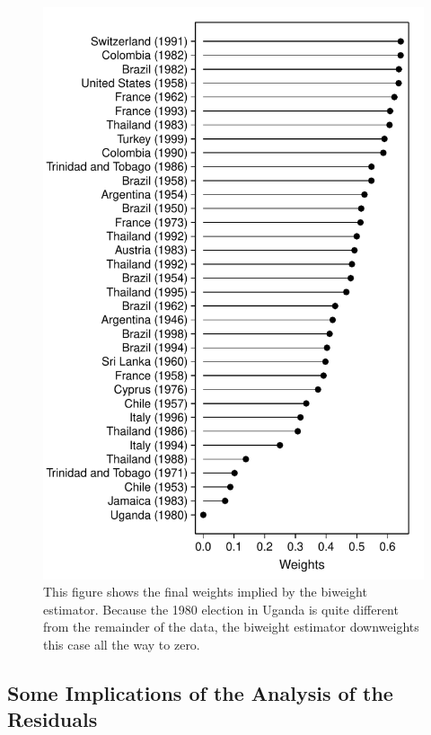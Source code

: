 \documentclass[12pt]{article}
\begin{document}
\begin{figure}[h!]
\begin{center}
\includegraphics[scale = 0.8]{figs/cg-weights.pdf}
\caption{This figure shows the final weights implied by the biweight estimator. Because the 1980 election in Uganda is quite different from the remainder of the data, the biweight estimator downweights this case all the way to zero.}\label{fig:cg-weights}
\end{center}
\end{figure}

\subsection*{Some Implications of the Analysis of the Residuals}
\end{document}
